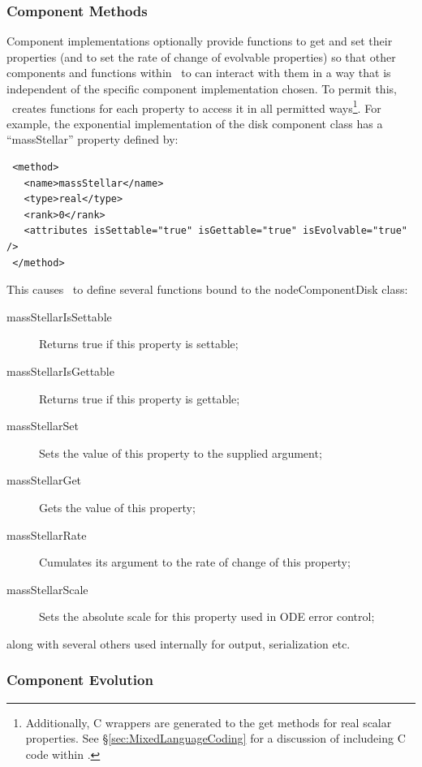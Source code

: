 \subsubsection{Component Methods}\label{sec:ComponentMethods}

Component implementations optionally provide functions to get and set their properties (and to set the rate of change of evolvable properties) so that other components and functions within \glc\ to can interact with them in a way that is independent of the specific component implementation chosen. To permit this, \glc\ creates functions for each property to access it in all permitted ways\footnote{Additionally, C wrappers are generated to the get methods for real scalar properties. See \S\protect\ref{sec:MixedLanguageCoding} for a discussion of includeing C code within \protect\glc.}. For example, the {\normalfont \ttfamily exponential} implementation of the {\normalfont \ttfamily disk} component class has a ``{\normalfont \ttfamily massStellar}'' property defined by:
\begin{verbatim}
 <method>
   <name>massStellar</name>
   <type>real</type>
   <rank>0</rank>
   <attributes isSettable="true" isGettable="true" isEvolvable="true" />
 </method>
\end{verbatim}
This causes \glc\ to define several functions bound to the {\normalfont \ttfamily nodeComponentDisk} class:
\begin{description}
\item [{\normalfont \ttfamily massStellarIsSettable}] Returns {\normalfont \ttfamily true} if this property is settable;
\item [{\normalfont \ttfamily massStellarIsGettable}] Returns {\normalfont \ttfamily true} if this property is gettable;
\item [{\normalfont \ttfamily massStellarSet}] Sets the value of this property to the supplied argument;
\item [{\normalfont \ttfamily massStellarGet}] Gets the value of this property;
\item [{\normalfont \ttfamily massStellarRate}] Cumulates its argument to the rate of change of this property;
\item [{\normalfont \ttfamily massStellarScale}] Sets the absolute scale for this property used in ODE error control;
\end{description}
along with several others used internally for output, serialization etc.

\subsubsection{Component Evolution}\label{sec:ComponentEvolution}

